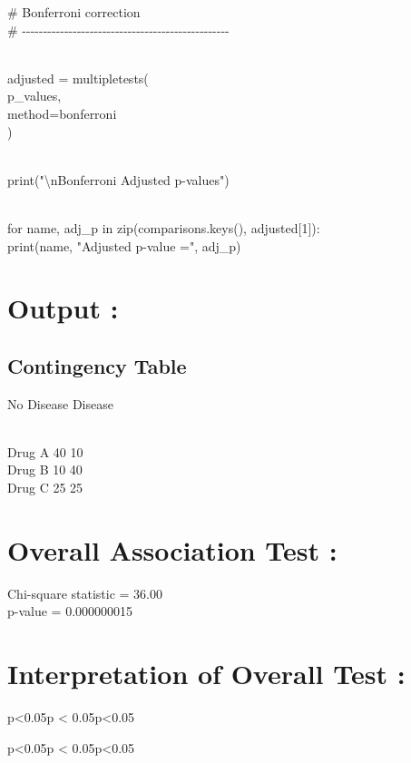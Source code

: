 \documentclass[
]{article}
\begin{document}
\# Bonferroni correction\\
\#
-\/-\/-\/-\/-\/-\/-\/-\/-\/-\/-\/-\/-\/-\/-\/-\/-\/-\/-\/-\/-\/-\/-\/-\/-\/-\/-\/-\/-\/-\/-\/-\/-\/-\/-\/-\/-\/-\/-\/-\/-\/-\/-\/-\/-\/-\/-\/-\/-\\
\strut \\
adjusted = multipletests(\\
p\_values,\\
method=\textquotesingle bonferroni\textquotesingle{}\\
)\\
\strut \\
print("\textbackslash nBonferroni Adjusted p-values")\\
\strut \\
for name, adj\_p in zip(comparisons.keys(), adjusted{[}1{]}):\\
print(name, "Adjusted p-value =", adj\_p)

\section{\texorpdfstring{ \textbf{Output :}}{ Output :}}\label{output-5}

\subsection{Contingency Table}\label{contingency-table-1}

No Disease Disease\\
\strut \\
Drug A 40 10\\
Drug B 10 40\\
Drug C 25 25

\section{Overall Association Test :}\label{overall-association-test}

Chi-square statistic = 36.00\\
p-value = 0.000000015

\section{\texorpdfstring{\textbf{Interpretation of Overall Test
:}}{Interpretation of Overall Test :}}\label{interpretation-of-overall-test}

p\textless0.05p \textless{} 0.05p\textless0.05

p\textless0.05p \textless{} 0.05p\textless0.05
\end{document}
